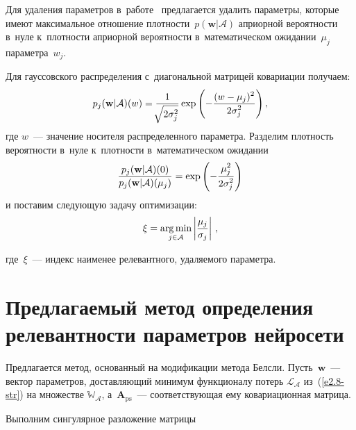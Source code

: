 \begin{multicols}{2}
\vspace*{-2pt}

Для удаления параметров в~работе~\cite{graves2011} предлагается удалить 
па\-ра\-мет\-ры, которые имеют максимальное отношение 
плот\-ности~$p(\mathbf{w}|\mathcal{A})$ априорной вероятности в~нуле к~плотности 
априорной ве\-ро\-ят\-ности в~математическом ожидании~$\mu_j$ па\-ра\-мет\-ра~$w_j$.

Для гауссовского распределения с~диагональной матрицей ковариации получаем:
\begin{equation*}
p_j(\mathbf{w}|\mathcal{A})(w) = \fr{1}{\sqrt[]{2\sigma_j^2}}\exp\left({-
\fr{(w-\mu_j)^2}{2\sigma_j^2}}\right), %
\end{equation*}
где $w$~--- значение носителя распределенного параметра.
Разделим плотность вероятности в~нуле к~плот\-ности в~математическом ожидании
\begin{equation*}
\displaystyle\frac{\displaystyle p_j(\mathbf{w}|\mathcal{A})(0)\mathstrut}{\displaystyle p_j(\mathbf{w}|\mathcal{A})(\mu_j)\mathstrut}= 
\exp\left({-\displaystyle\frac{\displaystyle \mu_j^2\mathstrut}{\displaystyle 2\sigma_j^2\mathstrut}}\right) 
\end{equation*}
и поставим следующую задачу оптимизации:
\begin{equation*}
\xi = \mathop{\mathrm{arg}\,\mathrm{min}}\limits_{j\in \mathcal{A}} \left\vert \displaystyle\frac{\displaystyle \mu_j\mathstrut}{\displaystyle \sigma_j\mathstrut}\right\vert\,, 
\end{equation*}

\vspace*{-8pt}

\columnbreak

\noindent
где~$\xi$~--- индекс наименее релевантного, удаляемого па\-ра\-метра.

\vspace*{-8pt}

\section{Предлагаемый метод определения релевантности параметров нейросети}

\vspace*{-2pt}

Предлагается метод, основанный на модификации метода Белсли. Пусть~$\mathbf{w}$~--- 
вектор параметров, доставляющий минимум функционалу потерь 
$\mathcal{L}_\mathcal{A}$ из~(\ref{e2.8-str}) на  множестве $\mathbb{W_\mathcal{A}}$, 
а~$\mathbf{A}_{\mathrm{ps}}$~--- соответствующая ему ковариационная матрица.

Выполним сингулярное разложение мат\-рицы


\end{multicols}

